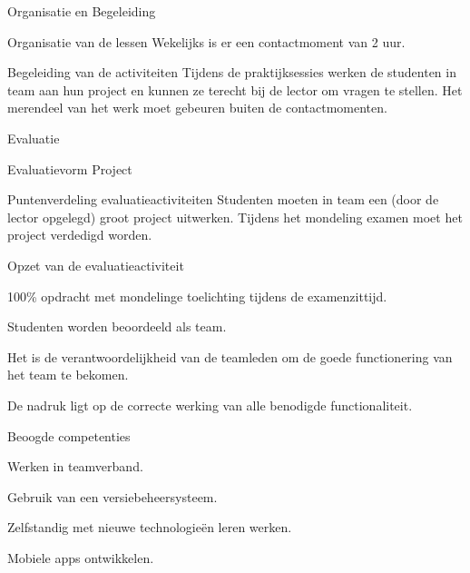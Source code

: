 \documentclass{studiewijzer}
\begin{document}
\showheader

\begin{categorybox}{Organisatie en Begeleiding}
    \begin{category}{Organisatie van de lessen}
        Wekelijks is er een contactmoment van 2 uur.
    \end{category}

    \begin{category}{Begeleiding van de activiteiten}
        Tijdens de praktijksessies werken de studenten in team aan hun project en kunnen ze terecht bij de lector om vragen te stellen.
        Het merendeel van het werk moet gebeuren buiten de contactmomenten.
    \end{category}
\end{categorybox}

\begin{categorybox}{Evaluatie}
    \begin{category}{Evaluatievorm}
        Project
    \end{category}

    \begin{category}{Puntenverdeling evaluatieactiviteiten}
        Studenten moeten in team een (door de lector opgelegd) groot project uitwerken.
        Tijdens het mondeling examen moet het project verdedigd worden.
    \end{category}

    \begin{category}{Opzet van de evaluatieactiviteit}
        \begin{items}
            \item 100\% opdracht met mondelinge toelichting tijdens de examenzittijd.
            \item Studenten worden beoordeeld als team.
            \item Het is de verantwoordelijkheid van de teamleden om de goede functionering van het team te bekomen.
            \item De nadruk ligt op de correcte werking van alle benodigde functionaliteit.
        \end{items}
    \end{category}

    \begin{category}{Beoogde competenties}
        \begin{items}
            \item Werken in teamverband.
            \item Gebruik van een versiebeheersysteem.
            \item Zelfstandig met nieuwe technologie\"en leren werken.
            \item Mobiele apps ontwikkelen.
        \end{items}
    \end{category}


\end{categorybox}
\end{document}
